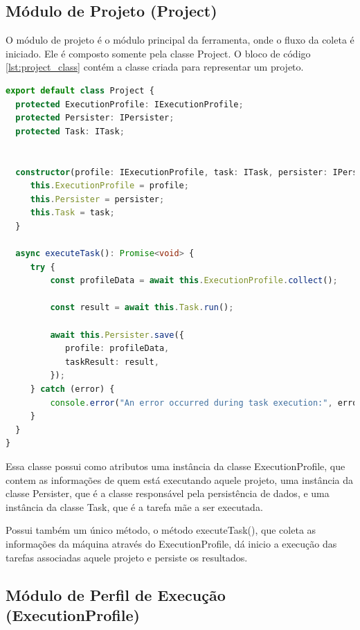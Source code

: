 \documentclass[12pt]{tcc}
\begin{document}
\subsection{Módulo de Projeto (Project)}
\label{subsection:modulo-project}

O módulo de projeto é o módulo principal da ferramenta, onde o fluxo da coleta é iniciado. Ele é composto somente pela classe Project. O bloco de código \ref{lst:project_class} contém a classe criada para representar um projeto.

\begin{lstlisting}[label={lst:project_class}, caption={Implementação da classe responsável por representar um projeto.}, language=TypeScript, breaklines=true]
export default class Project {
  protected ExecutionProfile: IExecutionProfile;
  protected Persister: IPersister;
  protected Task: ITask;


  constructor(profile: IExecutionProfile, task: ITask, persister: IPersister) {
     this.ExecutionProfile = profile;
     this.Persister = persister;
     this.Task = task;
  }

  async executeTask(): Promise<void> {
     try {
         const profileData = await this.ExecutionProfile.collect();

         const result = await this.Task.run();

         await this.Persister.save({
            profile: profileData,
            taskResult: result,
         });
     } catch (error) {
         console.error("An error occurred during task execution:", error);
     }
  }
}
\end{lstlisting}

Essa classe possui como atributos uma instância da classe ExecutionProfile, que contem as informações de quem está executando aquele projeto, uma instância da classe Persister, que é a classe responsável pela persistência de dados, e uma instância da classe Task, que é a tarefa mãe a ser executada.

Possui também um único método, o método executeTask(), que coleta as informações da máquina através do ExecutionProfile, dá inicio a execução das tarefas associadas aquele projeto e persiste os resultados.

\subsection{Módulo de Perfil de Execução (ExecutionProfile)}
\label{subsection:modulo-execution-profile}
\end{document}
